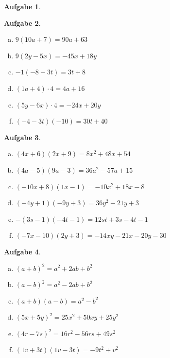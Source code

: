 \documentclass[12pt,fleqn]{article}
\theoremstyle{aufg}
\newtheorem{aufgabe}{Aufgabe}
\theoremstyle{bsp}
\begin{document}
\begin{flushleft}
\begin{aufgabe}
\begin{multicols}{2}
\begin{enumerate}[a)]
\end{enumerate} 
\end{multicols} 
\end{aufgabe} 
\begin{aufgabe} ~ \\ 
\begin{multicols}{3} 
\begin{enumerate}[a)] 
\item 
$9(10a+7)=90 a + 63$
\item 
$9(2y-5x)=- 45 x + 18 y$
\item 
$-1(-8-3t)=3 t + 8$
\item 
$(1a+4)\cdot 4=4 a + 16$
\item 
$(5y-6x)\cdot 4=- 24 x + 20 y$
\item 
$(-4-3t)(-10)=30 t + 40$
\end{enumerate} 
\end{multicols} 
\end{aufgabe} 
\begin{aufgabe} ~ \\ 
\begin{multicols}{3} 
\begin{enumerate}[a)] 
\item 
$(4x+6)(2x+9)=8 x^{2} + 48 x + 54$
\item 
$(4a-5)(9a-3)=36 a^{2} - 57 a + 15$
\item 
$(-10x+8)(1x-1)=- 10 x^{2} + 18 x - 8$
\item 
$(-4y+1)(-9y+3)=36 y^{2} - 21 y + 3$
\item 
$-(3s-1)(-4t-1)=12 s t + 3 s - 4 t - 1$
\item 
$(-7x-10)(2y+3)=- 14 x y - 21 x - 20 y - 30$
\end{enumerate} 
\end{multicols} 
\end{aufgabe} 
\begin{aufgabe} ~ \\ 
\begin{multicols}{3} 
\begin{enumerate}[a)] 
\item 
$(a+b)^2=a^{2} + 2 a b + b^{2}$
\item 
$(a-b)^2=a^{2} - 2 a b + b^{2}$
\item 
$(a+b)(a-b)=a^{2} - b^{2}$
\item 
$(5x+5y)^2=25 x^{2} + 50 x y + 25 y^{2}$
\item 
$(4r-7s)^2=16 r^{2} - 56 r s + 49 s^{2}$
\item 
$(1v+3t)(1v-3t)=- 9 t^{2} + v^{2}$

\end{enumerate}
\end{multicols}
\end{aufgabe}
\end{flushleft}
\end{document}
